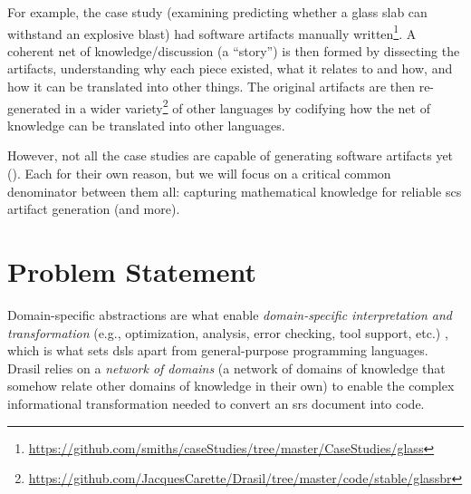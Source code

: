 For example, the  case study (examining predicting whether a glass
slab can withstand an explosive blast) had software artifacts manually
written\footnote{\url{https://github.com/smiths/caseStudies/tree/master/CaseStudies/glass}}.
A coherent net of knowledge/discussion (a ``story'') is then formed by
dissecting the artifacts, understanding why each piece existed, what it relates
to and how, and how it can be translated into other things. The original
artifacts are then re-generated in a wider
variety\footnote{\url{https://github.com/JacquesCarette/Drasil/tree/master/code/stable/glassbr}}
of other languages by codifying how the net of knowledge can be translated into
other languages.

However, not all the case studies are capable of generating software artifacts
yet (). Each for their own reason, but we will focus
on a critical common denominator between them all: capturing mathematical
knowledge for reliable \acs{scs} artifact generation (and more).

\section{Problem Statement}
\label{sec:intro:problemStatement}

\iffalse
      Drasil has de-duplicated knowledge across \acs{scs} artifacts relevant to
      specifications and code. Through codifying knowledge and creating coherent
      ``stories'', Drasil is able to generate a wide variety of software
      artifacts (e.g., \acs{oo} programs via \acs{gool} with guided usage via
      Makefiles, and requirements specifications [HTML and TeX]). This codified
      knowledge was de-duplicated from an originating set of artifacts via
      bottom-up gathering, however, we should be able to use the same knowledge
      to generate more artifacts in different languages, flavours, and with more
      options. However, each desired artifact language has its own way of
      encoding information (such as mathematical expressions). This leaves us
      needing to teach Drasil more about the targeted languages (and, at times,
      about the existing codified knowledge) in order to reliably generate
      usable artifacts.
\fi

Domain-specific abstractions are what enable \textit{domain-specific
      interpretation and transformation} (e.g., optimization, analysis, error
checking, tool support, etc.) \cite{Czarnecki2005}, which is what sets
\acsp{dsl} apart from general-purpose programming languages. Drasil relies on a
\textit{network of domains} (a network of domains of knowledge that somehow
relate other domains of knowledge in their own) to enable the complex
informational transformation needed to convert an \acs{srs} document into code.

